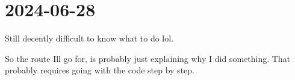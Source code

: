 \section{2024-06-28} %
\label{sec:2024-06-28}

Still decently difficult to know what to do lol. 

So the route Ill go for, is probably just explaining why I did something. That probably requires going with the code step by step.


